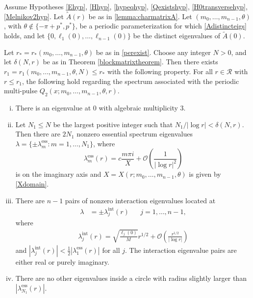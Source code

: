 \documentclass[thesis.tex]{subfiles}
\begin{document}
\begin{theorem}\label{theorem:multieigs}
Assume Hypotheses \ref{Ehyp}, \ref{Hhyp}, \ref{hypeqhyp}, \ref{Qexistshyp}, \ref{H0transversehyp}, \ref{Melnikov2hyp}. Let $\tilde{A}(r)$ be as in \cref{lemma:charmatrixA}. Let $(m_0, \dots, m_{n-1}, \theta)$, with $\theta \notin \{-\pi + p^*, p^* \}$, be a periodic parameterization for which \cref{Adistincteigs} holds, and let $\{ 0, \ell_1(0), \dots, \ell_{n-1}(0)\}$ be the distinct eigenvalues of $\tilde{A}(0)$. 

Let $r_* = r_*(m_0, \dots, m_{n-1}, \theta)$ be as in \cref{perexist}. Choose any integer $N > 0$, and let $\delta(N,r)$ be as in Theorem \ref{blockmatrixtheorem}. Then there exists $r_1 = r_1(m_0, \dots, m_{n-1}, \theta, N) \leq r_*$ with the following property. For all $r \in \mathcal{R}$ with $r \leq r_1$, the following hold regarding the spectrum associated with the periodic multi-pulse $Q_2(x; m_0, \dots, m_{n-1}, \theta, r)$.

\begin{enumerate}[(i)]
\item There is an eigenvalue at 0 with algebraic multiplicity 3.
\item Let $N_1 \leq N$ be the largest positive integer such that $N_1/|\log r| < \delta(N,r)$. Then there are $2N_1$ nonzero essential spectrum eigenvalues $\lambda = \{ \pm \lambda_m^{\text{ess}} : m = 1, \dots, N_1 \}$, where
\[
\lambda_m^{\text{ess}}(r) = c \frac{m \pi i}{X}+  \mathcal{O}\left( \frac{1}{|\log r|^2} \right)
\]
is on the imaginary axis and $X = X(r; m_0, \dots, m_{n-1}, \theta)$ is given by \cref{Xdomain}.

\item There are $n - 1$ pairs of nonzero interaction eigenvalues located at
\begin{align*}
\lambda &= \pm \lambda^{\text{int}}_j(r) && j = 1, \dots, n-1,
\end{align*}
where
\begin{align*}
\lambda^{\text{int}}_j(r) = \sqrt{\frac{\ell_j(0)}{M}}r^{1/2} + \mathcal{O}\left( \frac{r^{1/2}}{|\log r|}\right)
\end{align*}
and $|\lambda^{\text{int}}_j(r)| < \frac{1}{2}|\lambda_1^{\text{ess}}(r)|$ for all $j$. The interaction eigenvalue pairs are either real or purely imaginary.

\item There are no other eigenvalues inside a circle with radius slightly larger than $|\lambda_{N_1}^{\text{ess}}(r)|$.

\end{enumerate}
\end{theorem}
\end{document}
